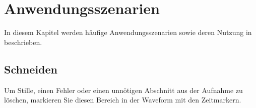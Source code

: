 \section{Anwendungsszenarien}
In diesem Kapitel werden häufige Anwendungsszenarien sowie deren Nutzung in \lectEditor{} beschrieben.

\subsection{Schneiden}
Um Stille, einen Fehler oder einen unnötigen Abschnitt aus der Aufnahme zu löschen, markieren Sie diesen Bereich in der Waveform mit den Zeitmarkern.

\newcommand{\editorslider}{%
  \begingroup\normalfont
  \texttt{[image: editor/slider]}%
  \endgroup
}
\newcommand{\editorsecondarysliderleft}{%
  \begingroup\normalfont
  \texttt{[image: editor/slider-left]}%
  \endgroup
}
\newcommand{\editorsecondarysliderright}{%
  \begingroup\normalfont
  \texttt{[image: editor/slider-right]}%
  \endgroup
}
\newcommand{\editorundo}{%
  \begingroup\normalfont
  \texttt{[image: editor/editor-undo]}%
  \endgroup
}
\newcommand{\editorcut}{%
  \begingroup\normalfont
  \texttt{[image: editor/editor-cut]}%
  \endgroup
}
\newcommand{\editoradjustvolume}{%
  \begingroup\normalfont
  \texttt{[image: editor/adjust-volume]}%
  \endgroup
}
\newcommand{\editorcollapseselection}{%
  \begingroup\normalfont
  \texttt{[image: editor/collapse-selection]}%
  \endgroup
}
\newcommand{\editorcutpage}{%
  \begingroup\normalfont
  \texttt{[image: editor/editor-cut-page]}%
  \endgroup
}
\newcommand{\editorreplacepage}{%
  \begingroup\normalfont
  \texttt{[image: editor/replace-page]}%
  \endgroup
}
\newcommand{\editorplay}{%
  \begingroup\normalfont
  \texttt{[image: editor/editor-play]}%
  \endgroup
}

